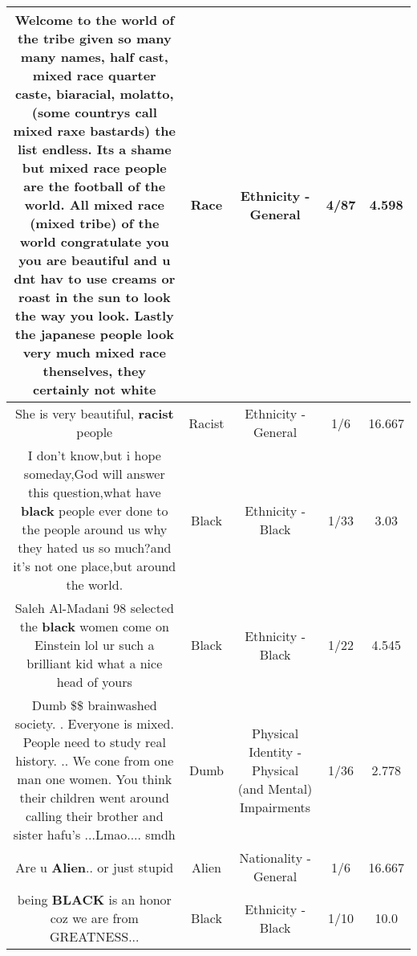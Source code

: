 \documentclass[11pt]{article}
\newlength\mylength
\begin{document}
\begin{center}
\begin{longtable}{|C{.65\mylength}|C{.30\mylength}|C{.12\mylength}|C{.12\mylength}|C{.12\mylength}|}
  \small Welcome to the world of the tribe given so many many names, half cast, mixed \textbf{race}  quarter caste, biaracial, molatto, (some countrys call mixed raxe bastards) the list endless. Its a shame but mixed \textbf{race} people are the football of the world. All mixed \textbf{race} (mixed tribe) of the world congratulate you you are beautiful and u dnt hav to use creams or roast in the sun to look the way you look. Lastly the japanese people look very much mixed \textbf{race} thenselves, they certainly not white\normalsize   & Race & Ethnicity - General & 4/87 & 4.598 \\  \hline
  \small She is very beautiful, \textbf{racist} people\normalsize   & Racist & Ethnicity - General & 1/6 & 16.667 \\  \hline
  \small I don't know,but i hope someday,God will answer this question,what have \textbf{black} people ever done to the people around us why they hated us so much?and it's not one place,but around the world.\normalsize   & Black & Ethnicity - Black & 1/33 & 3.03 \\  \hline
  \small Saleh Al-Madani 98 selected the \textbf{black} women come on Einstein lol ur such a brilliant kid what a nice head of yours\normalsize   & Black & Ethnicity - Black & 1/22 & 4.545 \\  \hline
  \small Dumb \@\$\$ brainwashed society. . Everyone is mixed. People need to study real history. .. We cone from one man one women.  You think their children went around calling their brother and sister hafu's ...Lmao.... smdh\normalsize   & Dumb & Physical Identity - Physical (and Mental) Impairments & 1/36 & 2.778 \\  \hline
  \small Are u \textbf{Alien}.. or just stupid\normalsize   & Alien & Nationality - General & 1/6 & 16.667 \\  \hline
  \small being \textbf{BLACK} is an honor coz we are from GREATNESS...\normalsize   & Black & Ethnicity - Black & 1/10 & 10.0 \\  \hline

\end{longtable}
\end{center}
\end{document}
